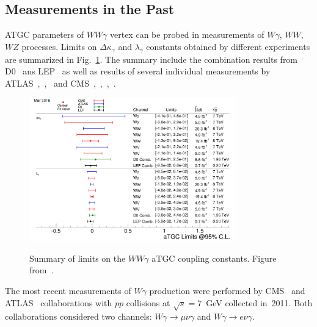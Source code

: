 \subsection{Measurements in the Past}
\label{sec:WgAbout_PastMeas}

ATGC parameters of $WW\gamma$ vertex can be probed in measurements of $W\gamma$, $WW$, $WZ$ processes. Limits on $\Delta \kappa_\gamma$ and $\lambda_\gamma$ constants obtained by different experiments are summarized in Fig.~\ref{fig:aTGC_cg}. The summary include the combination results from D0~\cite{ref_D0_aTGC_comb} ans LEP~\cite{ref_LEP_aTGC_comb} as well as results of several individual measurements by ATLAS~\cite{ref_7TeV_ATLAS},~\cite{ref_ATLAS_WW_8TeV},~\cite{ref_ATLAS_VW_8TeV} and CMS~\cite{ref_7TeV_CMS},~\cite{ref_CMS_WW_7TeV},~\cite{ref_CMS_WW_8TeV},~\cite{ref_CMS_VW_7TeV}.\\ 

\begin{figure}[htb]
  \begin{center}
    {\includegraphics[width=0.80\textwidth]{../figs/WgAbout/aTGC_cg.png}}
    \caption{Summary of limits on the $WW\gamma$ aTGC coupling constants. Figure from~\cite{ref_twiki_SMP_ATGC}.}
    \label{fig:aTGC_cg}
  \end{center}
\end{figure}

The most recent measurements of $W\gamma$ production were performed by CMS~\cite{ref_7TeV_CMS} and ATLAS~\cite{ref_7TeV_ATLAS} collaborations with $pp$ collisions at $\sqrt{s}=7$~GeV collected in~2011. Both collaborations considered two channels: $W\gamma\rightarrow\mu\nu\gamma$ and $W\gamma\rightarrow e\nu\gamma$.\\


